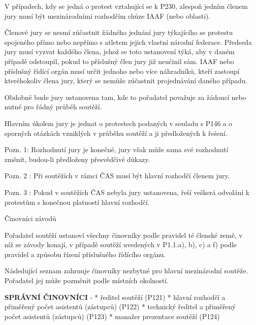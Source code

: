 V případech, kdy se jedná o protest vztahující se k P230, alespoň jedním členem jury musí být mezinárodními rozhodčím chůze IAAF (nebo oblasti).

Členové jury se nesmí zúčastnit žádného jednání jury týkajícího se protestu spojeného přímo nebo nepřímo s atletem jejich vlastní národní federace.
Předseda jury musí vyzvat každého člena, jehož se toto ustanovení týká, aby v daném případě odstoupil, pokud to příslušný člen jury již neučinil sám.
IAAF nebo příslušný řídící orgán musí určit jednoho nebo více náhradníků, kteří zastoupí kteréhokoliv člena jury, který se nemůže zúčastnit projednávání daného případu.

Obdobně bude jury ustanovena tam, kde to pořadatel považuje za žádoucí nebo nutné pro řádný průběh soutěží.

Hlavním úkolem jury je jednat o protestech podaných v souladu s P146 a o sporných otázkách vzniklých v průběhu soutěží a ji předložených k řešení.

Pozn. 1: Rozhodnutí jury je konečné, jury však může sama své rozhodnutí změnit, budou-li předloženy přesvědčivé důkazy.

Pozn. 2 : Při soutěžích v rámci ČAS musí být hlavní rozhodčí členem jury.

Pozn. 3 : Pokud v soutěžích ČAS nebyla jury ustanovena, řeší veškerá odvolání k protestům s konečnou platností hlavní rozhodčí.

\secc Činovníci závodů

Pořadatel soutěží ustanoví všechny činovníky podle pravidel té členské země, v níž se závody konají, v případě soutěží uvedených v P1.1.a), b), c) a f) podle pravidel a způsobu řízení příslušného řídícího orgánu.

Následující seznam zahrnuje činovníky nezbytné pro hlavní mezinárodní soutěže.
Pořadatel jej může pozměnit podle místních okolností.

{\bf SPRÁVNÍ ČINOVNÍCI}
\begitems \style -
* ředitel soutěží (P121)
* hlavní rozhodčí a přiměřený počet asistentů (zástupců) (P122)
* technický ředitel a přiměřený počet asistentů (zástupců) (P123)
* manažer prezentace soutěží (P124)
\enditems

